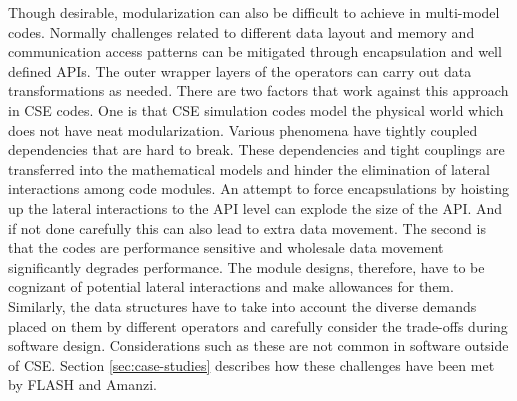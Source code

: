 Though desirable, modularization can also be difficult to achieve in
multi-model codes. Normally challenges related to different data
layout and memory and communication access patterns 
can be mitigated through encapsulation and well defined APIs. The outer
wrapper layers of the operators can carry out data transformations as
needed. There are two factors that work against this approach in CSE
codes. One is that CSE simulation codes model the physical world which does not
have neat modularization. Various phenomena have tightly coupled
dependencies that are hard to break. These dependencies and tight
couplings are transferred into the mathematical models and hinder the
elimination of lateral interactions among code modules. An attempt to
force encapsulations by hoisting up the lateral interactions to the
API level can explode the size of the API. And if not done carefully
this can also lead to extra data movement. The second is that 
the codes are performance sensitive and wholesale data movement
significantly degrades performance. 
The module designs,
therefore, have to be cognizant of potential lateral interactions and
make allowances for them. Similarly, the data structures have to take
into account the diverse demands placed on them by different operators
and carefully consider the trade-offs during software
design. Considerations such as these are not common in software
outside of CSE.   
Section \ref{sec:case-studies} describes how these challenges have
been met by FLASH and Amanzi.




